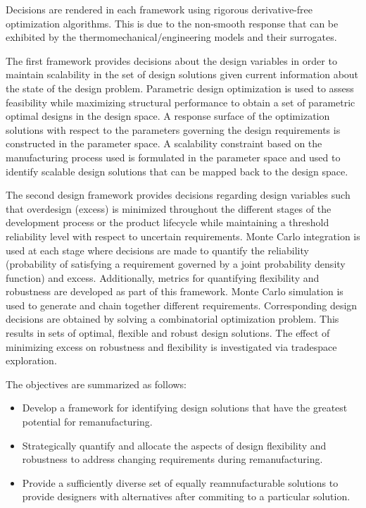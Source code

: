 Decisions are rendered in each framework using rigorous derivative-free optimization algorithms. This is due to the non-smooth response that can be exhibited by the thermomechanical/engineering models and their surrogates.

The first framework provides decisions about the design variables in order to maintain scalability in the set of design solutions given current information about the state of the design problem. Parametric design optimization is used to assess feasibility while maximizing structural performance to obtain a set of parametric optimal designs in the design space. A response surface of the optimization solutions with respect to the parameters governing the design requirements is constructed in the parameter space. A scalability constraint based on the manufacturing process used is formulated in the parameter space and used to identify scalable design solutions that can be mapped back to the design space.

The second design framework provides decisions regarding design variables such that overdesign (excess) is minimized throughout the different stages of the development process or the product lifecycle while maintaining a threshold reliability level with respect to uncertain requirements. Monte Carlo integration is used at each stage where decisions are made to quantify the reliability (probability of satisfying a requirement governed by a joint probability density function) and excess. Additionally, metrics for quantifying flexibility and robustness are developed as part of this framework. Monte Carlo simulation is used to generate and chain together different requirements. Corresponding design decisions are obtained by solving a combinatorial optimization problem. This results in sets of optimal, flexible and robust design solutions. The effect of minimizing excess on robustness and flexibility is investigated via tradespace exploration.

The objectives are summarized as follows:

\begin{itemize}
	\item{Develop a framework for identifying design solutions that have the greatest potential for remanufacturing.}
	\item{Strategically quantify and allocate the aspects of design flexibility and robustness to address changing requirements during remanufacturing.}
	\item{Provide a sufficiently diverse set of equally reamnufacturable solutions to provide designers with alternatives after commiting to a particular solution.}
\end{itemize}

